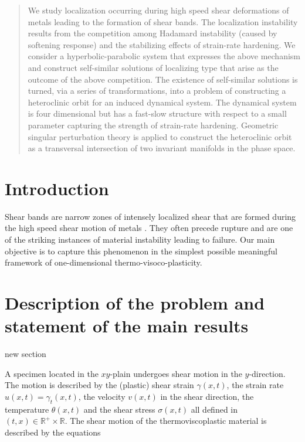 \documentclass[a4paper,11pt]{article}
\def\red{\color{red}}
\theoremstyle{remark}
\begin{document}
\begin{abstract}
We study localization occurring during high speed shear deformations of metals leading to the formation of shear bands.
The localization instability results from the competition among Hadamard instability (caused by softening response) and the stabilizing effects of strain-rate hardening.  We consider a hyperbolic-parabolic system that expresses the above mechanism and construct
self-similar solutions of localizing type that arise as the outcome of the above competition.
The existence of self-similar solutions is turned, via a series of transformations, 
 into a problem of constructing a heteroclinic orbit for an induced dynamical system.
The dynamical system is four dimensional but has a fast-slow structure 
with respect to a small parameter capturing the strength of strain-rate hardening.  
 Geometric singular perturbation theory is applied to construct the heteroclinic orbit as a transversal intersection of two invariant manifolds in the phase space.
\end{abstract}


\section{Introduction}
Shear bands are narrow zones of intensely localized shear that are formed during the high speed shear motion of metals \cite{zener_effect_1944, clifton_rev_1990}. 
They often precede rupture and are one of the striking instances of material instability leading to failure. 
Our main objective is to capture this phenomenon in the simplest possible meaningful framework of one-dimensional thermo-visoco-plasticity. 




\section{Description of the problem and statement of the main results}
{\red new section}


A specimen located in the $xy$-plain undergoes shear motion in the $y$-direction. The motion is described by the (plastic) shear strain
$\gamma(x,t)$, the strain rate $u(x,t) = \gamma_t (x,t)$, the velocity $v(x,t)$ in the shear direction, the temperature $\theta(x,t)$ and the shear stress
$\sigma (x,t)$ all defined in $(t,x)\in \mathbb{R}^+ \times \mathbb{R}$. The shear motion of the thermoviscoplastic material is described by the equations 
\end{document}
